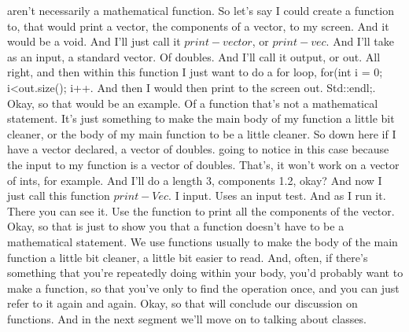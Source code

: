 \documentclass[10pt]{article}
\begin{document}
aren't necessarily a mathematical function.  So let's say I could create a function to, that would print a vector, the components of a vector, to my screen. And it would be a void. And I'll just call it $print-vector$, or $print-vec$. And I'll take as an input, a standard vector. Of doubles. And I'll call it output, or out. All right, and then within this function I just want to do a for loop, for(int i = 0; i<out.size(); i++. And then I would then print to the screen out. Std::endl;. Okay, so that would be an example. Of a function that's not a mathematical statement. It's just something to make the main body of my function a little bit cleaner, or the body of my main function to be a little cleaner. So down here if I have a vector declared, a vector of doubles. going to notice in this case because the input to my function is a vector of doubles. That's, it won't work on a vector of ints, for example. And I'll do a length 3, components 1.2, okay? And now I just call this function $print-Vec$. I input. Uses an input test. And as I run it. There you can see it. Use the function to print all the components of the vector. Okay, so that is just to show you that a function doesn't have to be a mathematical statement. We use functions usually to make the body of the main function a little bit cleaner, a little bit easier to read. And, often, if there's something that you're repeatedly doing within your body, you'd probably want to make a function, so that you've only to find the operation once, and you can just refer to it again and again. Okay, so that will conclude our discussion on functions. And in the next segment we'll move on to talking about classes.
\end{document}
